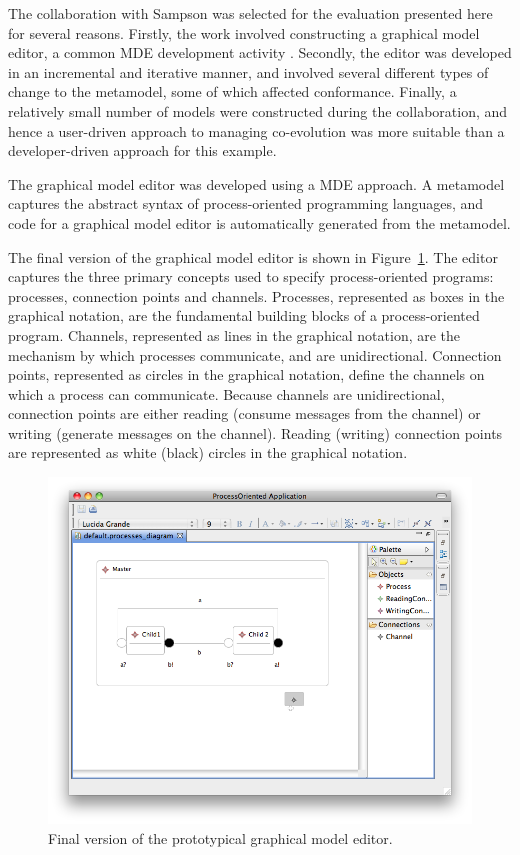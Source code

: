The collaboration with Sampson was selected for the evaluation presented here for several reasons. Firstly, \cc the work involved constructing a graphical model editor, a common MDE development activity \cite{amyot06evaluation}. Secondly, the editor was developed in an incremental and iterative manner, and involved several different types of change to the metamodel, some of which affected conformance. Finally, a relatively small number of models were constructed during the collaboration, and hence a user-driven approach to managing co-evolution was more suitable than a developer-driven approach for this example.

The graphical model editor was developed using a MDE approach. A metamodel captures the abstract syntax of process-oriented programming languages, and code for a graphical model editor is automatically generated from the metamodel. 

The final version of the graphical model editor is shown in Figure~\ref{fig:po_final_graphical_editor}. The editor captures the three primary concepts used to specify process-oriented programs: processes, connection points and channels. Processes, represented as boxes in the graphical notation, are the fundamental building blocks of a process-oriented program. Channels, represented as lines in the graphical notation, are the mechanism by which processes communicate, and are unidirectional. Connection points, represented as circles in the graphical notation, define the channels on which a process can communicate. Because channels are unidirectional, connection points are either reading (consume messages from the channel) or writing (generate messages on the channel). Reading (writing) connection points are represented as white (black) circles in the graphical notation.  

\begin{figure}[htbp]
	\centering
	\includegraphics[width=12.75cm]{6.Evaluation/images/user_driven/po_final_editor.png}
	\caption{Final version of the prototypical graphical model editor.}
	\label{fig:po_final_graphical_editor}
\end{figure}

